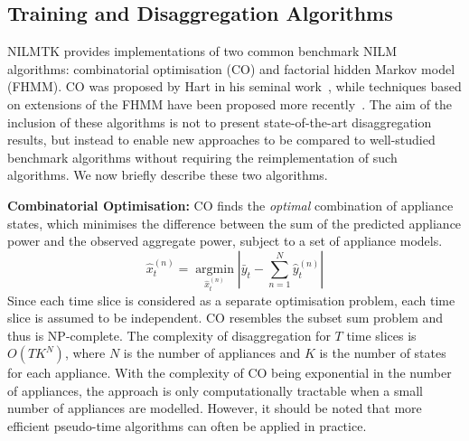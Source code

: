 \documentclass{sig-alternate}
\newcommand{\bluecolor}[1]{\textcolor{blue}{#1}}
\begin{document}
\subsection{Training and Disaggregation Algorithms}
\label{sec:training}
\noindent
NILMTK provides implementations of two common benchmark NILM algorithms: combinatorial optimisation (CO) and factorial hidden Markov model (FHMM). CO was proposed by Hart in his seminal work~\cite{hart_1992}, while techniques based on extensions of the FHMM have been proposed more recently~\cite{redd,kim_2011}. The aim of the inclusion of these algorithms is not to present state-of-the-art disaggregation results, but instead to enable new approaches to be compared to well-studied benchmark algorithms without requiring the reimplementation of such algorithms. We now briefly describe these two algorithms.

\textbf{Combinatorial Optimisation:}
CO finds the \textit{optimal} combination of appliance states, which minimises the difference between the sum of the predicted appliance power and the observed aggregate power, subject to a set of appliance models. 
\begin{equation}
\hat{x}^{(n)}_t=\operatorname*{arg min}_{\hat{x}^{(n)}_t}\left|\bar{y}_t-\sum\limits_{n=1}^{N}\hat{y}^{(n)}_t\right|
\end{equation}
Since each time slice is considered as a separate optimisation problem, each time slice is assumed to be independent.
CO resembles the subset sum problem and thus is NP-complete. The complexity of disaggregation for $T$ time slices is $O(TK^N)$, where $N$ is the number of appliances and $K$ is the number of states for each appliance. With the complexity of CO being exponential in the number of appliances, the approach is only computationally tractable when a small number of appliances are modelled. However, it should be noted that more efficient pseudo-time algorithms can often be applied in practice.
\end{document}
